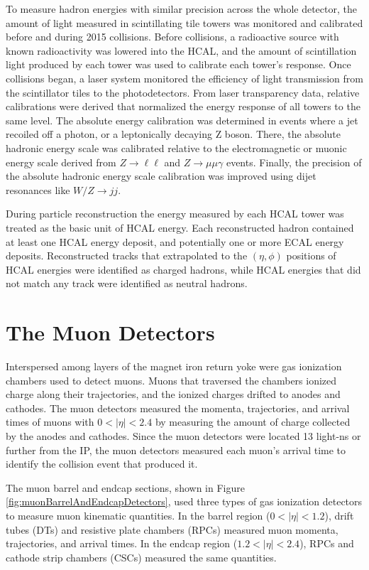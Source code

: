 To measure hadron energies with similar precision across the whole detector, the amount of light measured in scintillating tile towers 
was monitored and calibrated before and during 2015 collisions.  Before collisions, a radioactive source 
with known radioactivity was lowered into the HCAL, and the amount of scintillation light produced by each 
tower was used to calibrate each tower's response.  Once collisions began, a laser system 
monitored the efficiency of light transmission from the scintillator tiles to the photodetectors.  
From laser transparency data, relative calibrations were derived that normalized the energy response of all towers 
to the same level.  The absolute energy calibration was determined in events where a jet recoiled off a photon, or 
a leptonically decaying Z boson.  There, the absolute hadronic energy 
scale was calibrated relative to the electromagnetic or muonic energy scale derived from $Z \rightarrow \ell\ell$ 
and $Z \rightarrow \mu\mu\gamma$ events.  Finally, the precision of the absolute hadronic energy scale calibration 
was improved using dijet resonances like $W/Z \rightarrow jj$.

During particle reconstruction the energy measured by each HCAL tower was treated as the basic unit of HCAL energy.  
Each reconstructed hadron contained at least one HCAL energy deposit, and potentially one or more ECAL energy 
deposits.  Reconstructed tracks that extrapolated to the $(\eta,\phi)$ positions of HCAL energies were identified 
as charged hadrons, while HCAL energies that did not match any track were identified as neutral hadrons.


\section{The Muon Detectors}
\label{sec:muonDetectorsDescription}
Interspersed among layers of the magnet iron return yoke were gas ionization chambers used to detect muons.  Muons 
that traversed the chambers ionized charge along their trajectories, and the ionized charges drifted to 
anodes and cathodes.  The muon detectors measured the momenta, trajectories, and arrival times of muons with $0 < |\eta| < 2.4$ by 
measuring the amount of charge collected by the anodes and cathodes.  Since the muon detectors were located 13 light-ns 
or further from the IP, the muon detectors measured each muon's arrival time to identify the collision event that produced it.

The muon barrel and endcap sections, shown in Figure \ref{fig:muonBarrelAndEndcapDetectors}, used three types of 
gas ionization detectors to measure muon kinematic quantities.  In the barrel region ($0 < |\eta| < 1.2$), 
drift tubes (DTs) and resistive plate chambers (RPCs) measured muon momenta, trajectories, and arrival times.  In 
the endcap region ($1.2 < |\eta| < 2.4$), RPCs and cathode strip chambers (CSCs) measured the same quantities.

